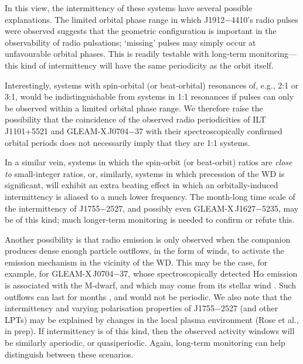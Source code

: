 \documentclass[fleqn,usenatbib]{mnras}
\newcommand{\revision}[2]{{\color{red}#2}}
\newcommand{\src}{J1755$-$2527}
\begin{document}
In this view, the intermittency of these systems have several possible explanations.
The limited orbital phase range in which J1912$-$4410's radio pulses were observed suggests that the geometric configuration is important in the observability of radio pulsations; `missing' pulses may simply occur at unfavourable orbital phases.
This is readily testable with long-term monitoring---this kind of intermittency will have the same periodicity as the orbit itself.

Interestingly, systems with spin-orbital (or beat-orbital) resonances of, e.g., 2:1 or 3:1, would be indistinguishable from systems in 1:1 resonances if pulses can \revision{}{only} be observed within a limited orbital phase range.
We therefore raise the possibility that the coincidence of the observed radio periodicities of ILT\,J1101+5521 and GLEAM-X\,J0704$-$37 with their spectroscopically confirmed orbital periods does not necessarily imply that they are 1:1 \revision{polars}{systems}.

In a similar vein, systems in which the spin-orbit (or beat-orbit) ratios are \emph{close to} small-integer ratios, or, similarly, systems in which precession of the WD is significant, will exhibit an extra beating effect in which an orbitally-induced intermittency is aliased to a much lower frequency.
The month-long time scale of the intermittency of \src{}, and possibly even GLEAM-X\,J1627$-$5235, may be of this kind; much longer-term monitoring is needed to confirm or refute this.

Another possibility is that radio emission is only observed when the companion produces dense enough particle outflows, in the form of winds, to activate the emission mechanism in the vicinity of the WD.
\revision{}{This may be the case, for example, for GLEAM-X\,J0704$-$37, whose spectroscopically detected H$\alpha$ emission is associated with the M-dwarf, and which may come from its stellar wind \citep{2025A&A...695L...8R}.}
Such outflows can last for months \citep{2021ApJ...915...37W}, and would not be periodic.
We also note that the intermittency and varying polarisation properties of \src{} (and other LPTs) may be explained by changes in the local plasma environment (Rose et al., in prep).
If intermittency is of this kind, then the observed activity windows will be similarly aperiodic, or quasiperiodic.
Again, long-term monitoring can help distinguish between these scenarios.



\end{document}
